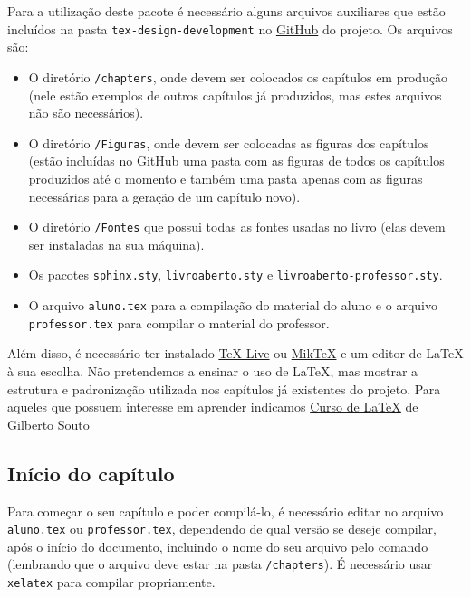 
Para a utilização deste pacote é necessário alguns arquivos auxiliares que estão incluídos na pasta \verb|tex-design-development| no \href{https://github.com/livro-aberto/tex-design-development/}{GitHub} do projeto. Os arquivos são:
\begin{itemize}
\item O diretório \verb|/chapters|, onde devem ser colocados os capítulos em produção (nele estão exemplos de outros capítulos já produzidos, mas estes arquivos não são necessários).
\item O diretório \verb|/Figuras|, onde devem ser colocadas as figuras dos capítulos (estão incluídas no GitHub uma pasta com as figuras de todos os capítulos produzidos até o momento e também uma pasta apenas com as figuras necessárias para a geração de um capítulo novo).
\item O diretório \verb|/Fontes| que possui todas as fontes usadas no livro (elas devem ser instaladas na sua máquina).
\item Os pacotes \verb|sphinx.sty|, \verb|livroaberto.sty| e \verb|livroaberto-professor.sty|.
\item O arquivo \verb|aluno.tex| para a compilação do material do aluno e o arquivo \verb|professor.tex| para compilar o material do professor.
\end{itemize}

Além disso, é necessário ter instalado \href{https://www.tug.org/texlive/}{\TeX{} Live} ou \href{https://miktex.org/}{Mik\TeX}{} e um editor de \LaTeX{} à sua escolha. Não pretendemos a ensinar o uso de \LaTeX, mas mostrar a estrutura e padronização utilizada nos capítulos já existentes do projeto. Para aqueles que possuem interesse em aprender indicamos \href{http://www.uft.edu.br/engambiental/prof/catalunha/arquivos/latex/latex_GilbertoSouto.pdf}{Curso de \LaTeX{}} de Gilberto Souto %


\subsection{Início do capítulo}

Para começar o seu capítulo e poder compilá-lo, é necessário editar no arquivo \verb|aluno.tex| ou \verb|professor.tex|, dependendo de qual versão se deseje compilar, após o início do documento, incluindo o nome do seu arquivo pelo comando \verb||(lembrando que o arquivo deve estar na pasta \verb|/chapters|). É necessário usar \verb|xelatex| para compilar propriamente.

